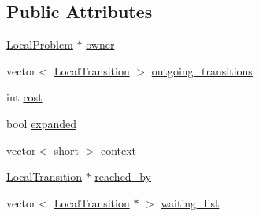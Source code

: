 \subsection*{Public Attributes}
\begin{DoxyCompactItemize}
\item 
\hyperlink{structcea__heuristic_1_1LocalProblem}{Local\-Problem} $\ast$ \hyperlink{structcea__heuristic_1_1LocalProblemNode_a63f142db9eae0ad7226e7762d012970d}{owner}
\item 
vector$<$ \hyperlink{structcea__heuristic_1_1LocalTransition}{Local\-Transition} $>$ \hyperlink{structcea__heuristic_1_1LocalProblemNode_aa688fc7b8d3e5a20bd4626a241ccf4df}{outgoing\-\_\-transitions}
\item 
int \hyperlink{structcea__heuristic_1_1LocalProblemNode_a87c14cc5411889dfcb28698a8e0b9e85}{cost}
\item 
bool \hyperlink{structcea__heuristic_1_1LocalProblemNode_ab67974efdbdd4bc581e7b7f986139115}{expanded}
\item 
vector$<$ short $>$ \hyperlink{structcea__heuristic_1_1LocalProblemNode_a5d965175a8b3062347961ed600c70be4}{context}
\item 
\hyperlink{structcea__heuristic_1_1LocalTransition}{Local\-Transition} $\ast$ \hyperlink{structcea__heuristic_1_1LocalProblemNode_ada7afd34f822d710322eb02cf9d0a956}{reached\-\_\-by}
\item 
vector$<$ \hyperlink{structcea__heuristic_1_1LocalTransition}{Local\-Transition} $\ast$ $>$ \hyperlink{structcea__heuristic_1_1LocalProblemNode_a81a3b7e46a45f6fe5eac9cae61846644}{waiting\-\_\-list}
\end{DoxyCompactItemize}


